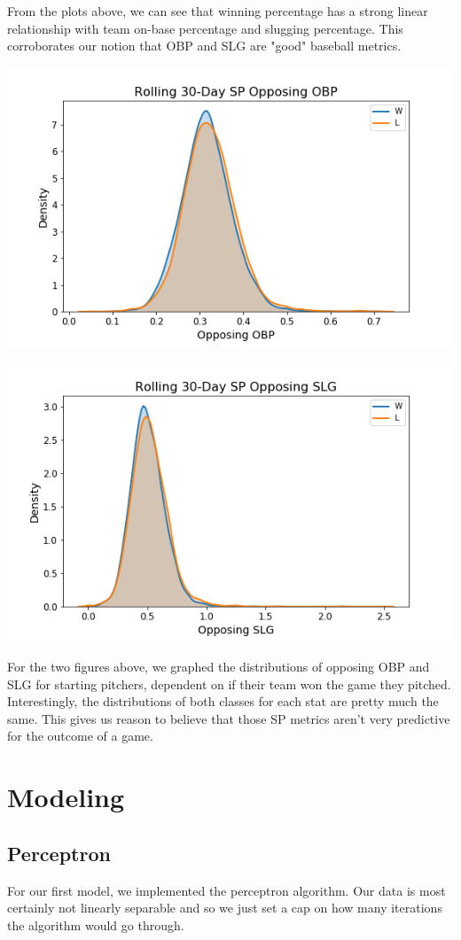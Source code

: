 \documentclass[12pt,onecolumn]{article}
\begin{document}
From the plots above, we can see that winning percentage has a strong linear relationship with team on-base percentage and slugging percentage. This corroborates our notion that OBP and SLG are "good" baseball metrics.

\begin{center}
\includegraphics[scale=0.6]{sp_obp}
\end{center}

\begin{center}
\includegraphics[scale=0.6]{sp_slg}
\end{center}

For the two figures above, we graphed the distributions of opposing OBP and SLG for starting pitchers, dependent on if their team won the game they pitched. Interestingly, the distributions of both classes for each stat are pretty much the same. This gives us reason to believe that those SP metrics aren't very predictive for the outcome of a game.

\section*{Modeling}
\subsection*{Perceptron}
For our first model, we implemented the perceptron algorithm. Our data is most certainly not linearly separable and so we just set a cap on how many iterations the algorithm would go through.
\end{document}
